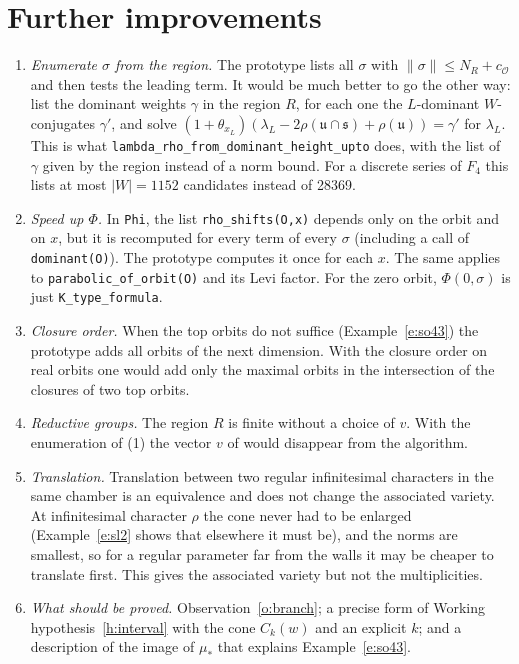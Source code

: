 \documentclass[11pt,leqno]{article}
\theoremstyle{definition}
\numberwithin{equation}{section}
\newcommand{\Ob}{\mathcal O}
\newcommand{\fs}{\mathfrak s}
\newcommand{\fu}{\mathfrak u}
\newcommand{\at}[1]{\texttt{#1}}
\begin{document}
\section{Further improvements}
\label{s:further}

\begin{enumerate}
\item \emph{Enumerate $\sigma$ from the region.}  The prototype lists all
$\sigma$ with $\|\sigma\|\le N_R+c_\Ob$ and then tests the leading term.  It
would be much better to go the other way: list the dominant weights $\gamma$
in the region $R$, for each one the $L$-dominant $W$-conjugates $\gamma'$, and
solve $(1+\theta_{x_L})(\lambda_L-2\rho(\fu\cap\fs)+\rho(\fu))=\gamma'$ for
$\lambda_L$.  This is what \at{lambda\_rho\_from\_dominant\_height\_upto} does,
with the list of $\gamma$ given by the region instead of a norm bound.  For a
discrete series of $F_4$ this lists at most $|W|=1152$ candidates instead of
28369.
\item \emph{Speed up $\Phi$.}  In \at{Phi}, the list \at{rho\_shifts(O,x)}
depends only on the orbit and on $x$, but it is recomputed for every term of
every $\sigma$ (including a call of \at{dominant(O)}).  The prototype
computes it once for each $x$.  The same applies to
\at{parabolic\_of\_orbit(O)} and its Levi factor.  For the zero orbit,
$\Phi(0,\sigma)$ is just \at{K\_type\_formula}.
\item \emph{Closure order.}  When the top orbits do not suffice
(Example~\ref{e:so43}) the prototype adds all orbits of the next dimension.
With the closure order on real orbits one would add only the maximal orbits
in the intersection of the closures of two top orbits.
\item \emph{Reductive groups.}  The region $R$ is finite without a choice of
$v$.  With the enumeration of (1) the vector $v$ of \cite[Section~8]{KN} would
disappear from the algorithm.
\item \emph{Translation.}  Translation between two regular infinitesimal
characters in the same chamber is an equivalence and does not change the
associated variety.  At infinitesimal character $\rho$ the cone never had to
be enlarged (Example~\ref{e:sl2} shows that elsewhere it must be), and the
norms are smallest, so for a regular parameter far from the walls it may be
cheaper to translate first.  This gives the associated variety but not the
multiplicities.
\item \emph{What should be proved.}  Observation~\ref{o:branch}; a precise
form of Working hypothesis~\ref{h:interval} with the cone $C_k(w)$ and an explicit
$k$; and a description of the image of $\mu_*$ that explains
Example~\ref{e:so43}.
\end{enumerate}
\end{document}

